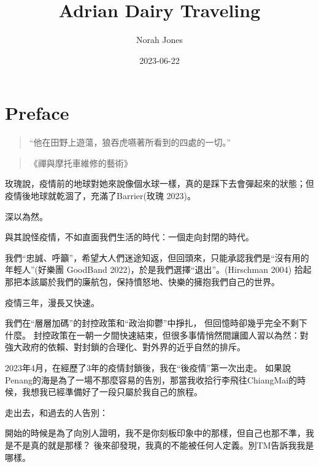\documentclass[
  a4paper,
]{ctexart}
\title{Adrian Dairy Traveling}
\author{Norah Jones}
\date{2023-06-22}
\renewcommand*\contentsname{Table of contents}
\newcommand\contentsname{Table of contents}
\begin{document}
\maketitle
\ifdefined\Shaded\renewenvironment{Shaded}{\begin{tcolorbox}[frame hidden, boxrule=0pt, borderline west={3pt}{0pt}{shadecolor}, breakable, enhanced, interior hidden, sharp corners]}{\end{tcolorbox}}\fi

\renewcommand*\contentsname{Table of contents}
{
\hypersetup{linkcolor=}
\setcounter{tocdepth}{2}
\tableofcontents
}

\hypertarget{preface}{%
\chapter*{Preface}\label{preface}}


\begin{quote}
``他在田野上遊蕩，狼吞虎嚥著所看到的四處的一切。''
\end{quote}

\begin{quote}
《禪與摩托車維修的藝術》
\end{quote}

玫瑰說，疫情前的地球對她來說像個水球一樣，真的是踩下去會彈起來的狀態；但疫情後地球就乾涸了，充滿了Barrier(玫瑰
2023)。

深以為然。

與其說怪疫情，不如直面我們生活的時代：一個走向封閉的時代。

我們``忠誠、呼籲''，希望大人們迷途知返，但回頭來，只能承認我們是``沒有用的年輕人''(好樂團
GoodBand 2022)，於是我們選擇``退出''。(Hirschman 2004)
拾起那把本該屬於我們的廉航包，保持憤怒地、快樂的擁抱我們自己的世界。

疫情三年，漫長又快速。

我們在``層層加碼''的封控政策和``政治抑鬱''中掙扎，
但回憶時卻幾乎完全不剩下什麼。
封控政策在一朝一夕間快速結束，但很多事情悄然間讓國人習以為然：對強大政府的依賴、對封鎖的合理化、對外界的近乎自然的排斥。

2023年4月，在經歷了3年的疫情封鎖後，我在``後疫情''第一次出走。
如果說Penang的海是為了一場不那麼容易的告別，那當我收拾行李飛往ChiangMai的時候，我想我已經準備好了一段只屬於我自己的旅程。

走出去，和過去的人告別：

開始的時候是為了向別人證明，我不是你刻板印象中的那樣，但自己也那不準，我是不是真的就是那樣？
後來卻發現，我真的不能被任何人定義。別TM告訴我我是哪樣。
\end{document}
